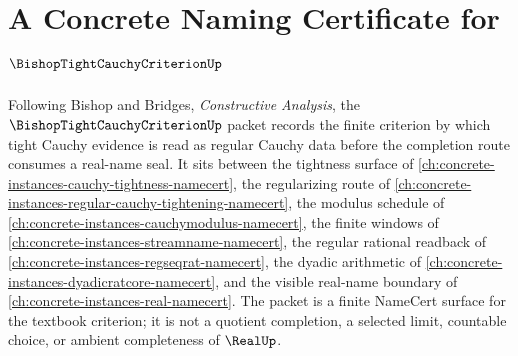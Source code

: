 \chapter{A Concrete Naming Certificate for $\BishopTightCauchyCriterionUp$}
\label{ch:concrete-instances-bishop-tight-cauchy-criterion-namecert}

Following Bishop and Bridges, \emph{Constructive Analysis}, the $\BishopTightCauchyCriterionUp$ packet records the finite criterion by which tight Cauchy evidence is read as regular Cauchy data before the completion route consumes a real-name seal. It sits between the tightness surface of \autoref{ch:concrete-instances-cauchy-tightness-namecert}, the regularizing route of \autoref{ch:concrete-instances-regular-cauchy-tightening-namecert}, the modulus schedule of \autoref{ch:concrete-instances-cauchymodulus-namecert}, the finite windows of \autoref{ch:concrete-instances-streamname-namecert}, the regular rational readback of \autoref{ch:concrete-instances-regseqrat-namecert}, the dyadic arithmetic of \autoref{ch:concrete-instances-dyadicratcore-namecert}, and the visible real-name boundary of \autoref{ch:concrete-instances-real-namecert}. The packet is a finite NameCert surface for the textbook criterion; it is not a quotient completion, a selected limit, countable choice, or ambient completeness of $\RealUp$.

